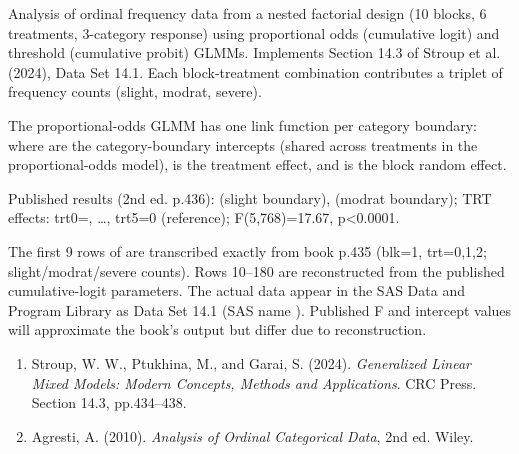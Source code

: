 \documentclass[a4paper]{book}
\begin{document}
%
\begin{Description}
Analysis of ordinal frequency data from a nested factorial design (10 blocks,
6 treatments, 3-category response) using proportional odds (cumulative logit)
and threshold (cumulative probit) GLMMs.  Implements Section 14.3 of Stroup
et al. (2024), Data Set 14.1.  Each block-treatment combination contributes a
triplet of frequency counts (slight, modrat, severe).
\end{Description}
%
\begin{Details}
The proportional-odds GLMM has one link function per category boundary:
where  are the category-boundary intercepts (shared across
treatments in the proportional-odds model),  is the treatment
effect, and  is the block random
effect.

Published results (2nd ed. p.436):
 (slight boundary), 
(modrat boundary); TRT effects: trt0=, \ldots, trt5=0 (reference);
F(5,768)=17.67, p<0.0001.
\end{Details}
%
\begin{Note}
 The first 9 rows of  are transcribed
exactly from book p.435 (blk=1, trt=0,1,2; slight/modrat/severe counts).
Rows 10–180 are reconstructed from the published cumulative-logit parameters.
The actual data appear in the SAS Data and Program Library as Data Set 14.1
(SAS name ).  Published F and intercept values will
approximate the book's output but differ due to reconstruction.
\end{Note}
%
\begin{References}
\begin{enumerate}

\item{} Stroup, W. W., Ptukhina, M., and Garai, S. (2024).
\emph{Generalized Linear Mixed Models: Modern Concepts, Methods and
Applications}. CRC Press. Section 14.3, pp.434–438.
\item{} Agresti, A. (2010). \emph{Analysis of Ordinal Categorical Data},
2nd ed. Wiley.

\end{enumerate}

\end{References}
\end{document}
